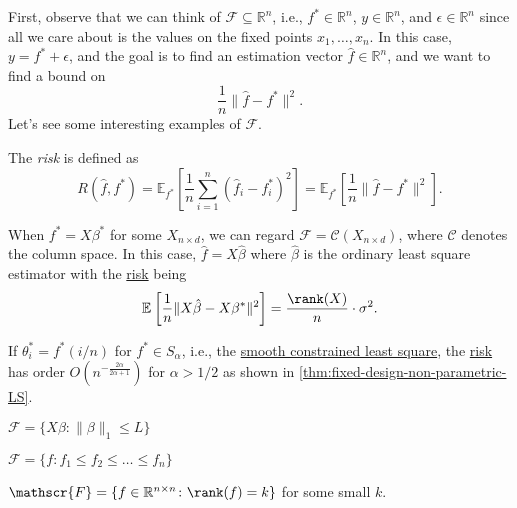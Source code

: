 First, observe that we can think of \(\mathscr{F} \subseteq \mathbb{R} ^n\), i.e., \(f^{\ast} \in \mathbb{R} ^n\), \(y\in \mathbb{R} ^n\), and \(\epsilon \in \mathbb{R} ^n\) since all we care about is the values on the fixed points \(x_1, \dots , x_n\). In this case, \(y = f^{\ast} + \epsilon \), and the goal is to find an estimation vector \(\hat{f} \in \mathbb{R} ^n\), and we want to find a bound on
\[
	\frac{1}{n} \lVert \hat{f} - f^{\ast} \rVert ^2.
\]
Let's see some interesting examples of \(\mathscr{F} \).

\begin{notation}[Risk]\label{not:risk}
	The \emph{risk} is defined as
	\[
		R(\hat{f} , f^{\ast} )
		= \mathbb{E}_{f^{\ast} }\left[ \frac{1}{n} \sum_{i=1}^{n} (\hat{f} _i - f^{\ast} _i)^2 \right]
		= \mathbb{E}_{f^{\ast} }\left[ \frac{1}{n} \lVert \hat{f} - f^{\ast} \rVert ^2 \right] .
	\]
\end{notation}

\begin{eg}
	When \(f^{\ast} = X \beta ^{\ast} \) for some \(X_{n \times d}\), we can regard \(\mathscr{F} = \mathcal{C} (X_{n\times d})\), where \(\mathcal{C} \) denotes the column space. In this case, \(\hat{f} = X \hat{\beta} \) where \(\hat{\beta} \) is the ordinary least square estimator with the \hyperref[not:risk]{risk} being
	\[
		\mathbb{E}_{}\left[\frac{1}{n} \lVert X \hat{\beta} - X \beta ^{\ast} \rVert ^2 \right] = \frac{\rank (X)}{n} \cdot \sigma ^2.
	\]
\end{eg}

\begin{eg}
	If \(\theta ^{\ast} _i = f^{\ast} (i / n)\) for \(f^{\ast} \in S_\alpha \), i.e., the \hyperref[prb:smooth-LS]{smooth constrained least square}, the \hyperref[not:risk]{risk} has order \(O(n^{- \frac{2\alpha }{2\alpha + 1}})\) for \(\alpha > 1 / 2\) as shown in \autoref{thm:fixed-design-non-parametric-LS}.
\end{eg}

\begin{eg}
	\(\mathscr{F} = \{ X \beta \colon \lVert \beta \rVert _1 \leq L \} \)
\end{eg}

\begin{eg}
	\(\mathscr{F} = \{f \colon f_1 \leq f_2 \leq \dots \leq f_n \} \)
\end{eg}

\begin{eg}
	\(\mathscr{F} = \{f \in \mathbb{R} ^{n \times n} \colon \rank (f) = k \} \) for some small \(k\).
\end{eg}

